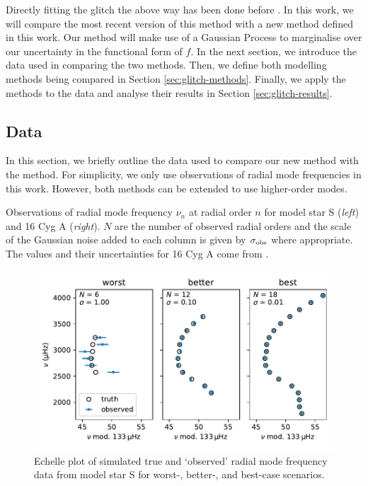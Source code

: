 
Directly fitting the glitch the above way has been done before \citep[e.g.][]{Verma.Faria.ea2014,Verma.Raodeo.ea2017}. In this work, we will compare the most recent version of this method \citep[][hereafter V19]{Verma.Raodeo.ea2019} with a new method defined in this work. Our method will make use of a Gaussian Process to marginalise over our uncertainty in the functional form of \(f\). In the next section, we introduce the data used in comparing the two methods. Then, we define both modelling methods being compared in Section \ref{sec:glitch-methods}. Finally, we apply the methods to the data and analyse their results in Section \ref{sec:glitch-results}.

\subsection{Data}\label{sec:glitch-data}

In this section, we briefly outline the data used to compare our new method with the  method. For simplicity, we only use observations of radial mode frequencies in this work. However, both methods can be extended to use higher-order modes.

\begin{table}
    \centering
    \caption{Observations of radial mode frequency \(\nu_n\) at radial order \(n\) for model star S (\emph{left}) and 16 Cyg A (\emph{right}). \(N\) are the number of observed radial orders and the scale of the Gaussian noise added to each column is given by \(\sigma_{{\mathrm{obs}}}\) where appropriate. The values and their uncertainties for 16 Cyg A come from \citet{Lund.SilvaAguirre.ea2017}.}
    \label{tab:glitch-obs}
    
\end{table}

\begin{figure}[!tb]
    \centering
    \includegraphics{figures/glitch-test-obs.pdf}
    \caption{Echelle plot of simulated true and `observed' radial mode frequency data from model star S for worst-, better-, and best-case scenarios.}
    \label{fig:glitch-test-obs}
\end{figure}

